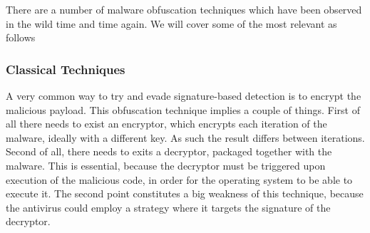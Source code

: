 There are a number of malware obfuscation techniques which have been observed in the wild time and time again. We will cover some of the most relevant as follows

\subsubsection{Classical Techniques}



A very common way to try and evade signature-based detection is to encrypt the malicious payload. This obfuscation technique implies a couple of things. First of all there needs to exist an encryptor, which encrypts each iteration of the malware, ideally with a different key. As such the result differs between iterations. Second of all, there needs to exits a decryptor, packaged together with the malware. This is essential, because the decryptor must be triggered upon execution of the malicious code, in order for the operating system to be able to execute it. The second point constitutes a big weakness of this technique, because the antivirus could employ a strategy where it targets the signature of the decryptor.

